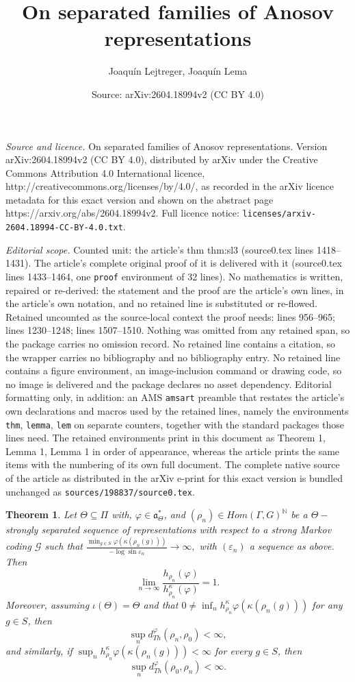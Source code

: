 \documentclass[10pt,a4paper]{amsart}
\title{On separated families of Anosov representations}
\author{Joaqu\'in Lejtreger, Joaqu\'in Lema}
\date{Source: arXiv:2604.18994v2 (CC BY 4.0)}
\newtheorem{thm}{Theorem}
\begin{document}
\maketitle

\noindent\emph{Source and licence.} On separated families of Anosov representations. Version arXiv:2604.18994v2 (CC BY 4.0), distributed by arXiv under the Creative Commons Attribution 4.0 International licence, http://creativecommons.org/licenses/by/4.0/, as recorded in the arXiv licence metadata for this exact version and shown on the abstract page https://arxiv.org/abs/2604.18994v2. Full licence notice: \texttt{licenses/arxiv-2604.18994-CC-BY-4.0.txt}.\par\smallskip

\noindent\textit{Editorial scope.} Counted unit: the article's thm thm:sl3 (source0.tex lines 1418--1431). The article's complete original proof of it is delivered with it (source0.tex lines 1433--1464, one \texttt{proof} environment of 32 lines). No mathematics is written, repaired or re-derived: the statement and the proof are the article's own lines, in the article's own notation, and no retained line is substituted or re-flowed.  Retained uncounted as the source-local context the proof needs: lines 956--965; lines 1230--1248; lines 1507--1510.  Nothing was omitted from any retained span, so the package carries no omission record.  No retained line contains a citation, so the wrapper carries no bibliography and no bibliography entry.  No retained line contains a figure environment, an image-inclusion command or drawing code, so no image is delivered and the package declares no asset dependency.  Editorial formatting only, in addition: an AMS \texttt{amsart} preamble that restates the article's own declarations and macros used by the retained lines, namely the environments \texttt{thm}, \texttt{lemma}, \texttt{lem} on separate counters, together with the standard packages those lines need.  The retained environments print in this document as Theorem 1, Lemma 1, Lemma 1 in order of appearance, whereas the article prints the same items with the numbering of its own full document.  The complete native source of the article as distributed in the arXiv e-print for this exact version is bundled unchanged as \texttt{sources/198837/source0.tex}.
\begin{thm}
\label{thm:general+}
Let $\Theta \subseteq \Pi$ with, $\varphi \in \mathfrak{a}_\Theta^*$, and $(\rho_n) \in Hom (\Gamma,G)^\mathbb{N}$ be a $\Theta-$strongly separated sequence of representations with respect to a strong Markov coding $\mathcal{G}$ such that $\frac{\min_{g \in S} \varphi (\kappa (\rho_n (g)))}{ -\log \sin \varepsilon_n} \to \infty,$ with $(\varepsilon_n)$ a sequence as above. 
Then
$$\lim_{n \to \infty} \frac{h_{\rho_n} (\varphi)}{h_{\rho_n}^\kappa (\varphi)} = 1.$$
Moreover, assuming $\iota(\Theta) = \Theta$ and that $0 \neq \inf_n h_{\rho_n}^\kappa \varphi (\kappa (\rho_n (g)))$ for any $g \in S$, then
$$\sup_n d_{Th}^\varphi (\rho_n, \rho_0) <\infty,$$
and similarly, if $\sup_n h_{\rho_n}^\kappa \varphi (\kappa (\rho_n (g))) <\infty$ for every $g \in S$, then
$$\sup_n d_{Th}^\varphi (\rho_0,\rho_n) < \infty.$$
\end{thm}
\end{document}
